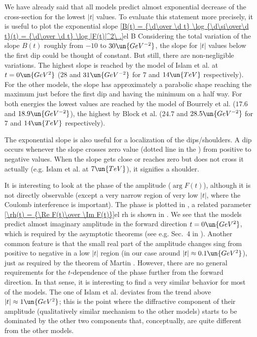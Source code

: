 

We have already said that all models predict almost exponential decrease of the cross-section for the lowest $|t|$ values. To evaluate this statement more precisely, it is useful to plot the exponential slope
\eqref{B(t) = {\d\over \d t} \log {\d\si\over\d t}(t) = {\d\over \d t} \log |F(t)|^2\ .}{el B}
Considering the total variation of the slope $B(t)$ roughly from $-10$ to $30\un{GeV^{-2}}$, the slope for $|t|$ values below the first dip could be thought of constant. But still, there are non-negligible variations. The highest slope is reached by the model of Islam et al. at $t=0\un{GeV^2}$ ($28$ and $31\un{GeV^{-2}}$ for $7$ and $14\un{TeV}$ respectively). For the other models, the slope has approximately a parabolic shape reaching the maximum just before the first dip and having the minimum on a half way. For both energies the lowest values are reached by the model of Bourrely et al. ($17.6$ and $18.9\un{GeV^{-2}}$), the highest by Block et al. ($24.7$ and $28.5\un{GeV^{-2}}$ for $7$ and $14\un{TeV}$ respectively).

The exponential slope is also useful for a localization of the dips/shoulders. A dip occurs whenever the slope crosses zero value (dotted line in the ) from positive to negative values. When the slope gets close or reaches zero but does not cross it actually (e.g. Islam et al. at $7\un{TeV}$), it signifies a shoulder.


It is interesting to look at the phase of the amplitude ($\arg F(t)$), although it is not directly observable (except a very narrow region of very low $|t|$, where the Coulomb interference is important). The phase is plotted in , a related parameter 
\eqref{\rh(t) = {\Re F(t)\over \Im F(t)}}{el rh}
is shown in . We see that the models predict almost imaginary amplitude in the forward direction $t=0\un{GeV^2}$, which is required by the asymptotic theorems (see e.g. Sec.~4 in ). Another common feature is that the small real part of the amplitude changes sing from positive to negative in a low $|t|$ region (in our case around $|t| \approx 0.1\un{GeV^2}$), just as required by the theorem of Martin . However, there are no general requirements for the $t$-dependence of the phase further from the forward direction. In that sense, it is interesting to find a very similar behavior for most of the models. The one of Islam et al. deviates from the trend above $|t|\approx 1\un{GeV^2}$; this is the point where the diffractive component of their amplitude (qualitatively similar mechanism to the other models) starts to be dominated by the other two components that, conceptually, are quite different from the other models.


